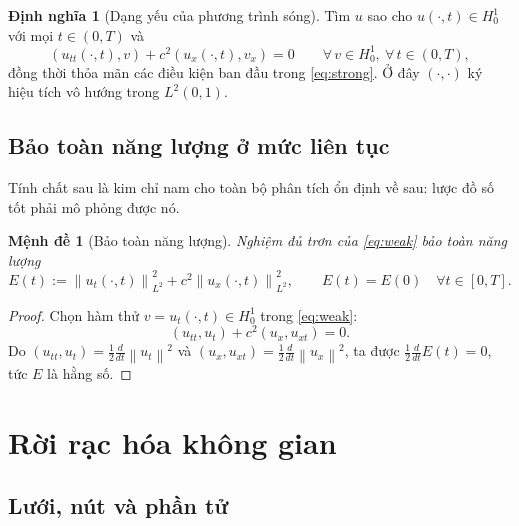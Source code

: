 \documentclass[11pt,a4paper]{article}
\theoremstyle{plain}
\newtheorem{proposition}[theorem]{Mệnh đề}
\theoremstyle{definition}
\newtheorem{definition}[theorem]{Định nghĩa}
\theoremstyle{remark}
\newcommand{\Hzero}{H^{1}_{0}}
\newcommand{\Ltwo}{L^{2}}
\newcommand{\norm}[1]{\left\lVert #1 \right\rVert}
\newcommand{\ip}[2]{\left( #1 , #2 \right)}
\begin{document}
\begin{definition}[Dạng yếu của phương trình sóng]
\label{def:weak}
Tìm $u$ sao cho $u(\cdot,t) \in \Hzero$ với mọi $t \in (0,T)$ và
\begin{equation}
\label{eq:weak}
  \ip{u_{tt}(\cdot,t)}{v} + c^{2}\ip{u_{x}(\cdot,t)}{v_{x}} = 0
  \qquad \forall\, v \in \Hzero,\ \forall\, t \in (0,T),
\end{equation}
đồng thời thỏa mãn các điều kiện ban đầu trong \eqref{eq:strong}. Ở đây
$\ip{\cdot}{\cdot}$ ký hiệu tích vô hướng trong $\Ltwo(0,1)$.
\end{definition}

\subsection{Bảo toàn năng lượng ở mức liên tục}

Tính chất sau là kim chỉ nam cho toàn bộ phân tích ổn định về sau: lược đồ
số tốt phải mô phỏng được nó.

\begin{proposition}[Bảo toàn năng lượng]
\label{prop:energy}
Nghiệm đủ trơn của \eqref{eq:weak} bảo toàn năng lượng
\begin{equation}
\label{eq:cont-energy}
  E(t) := \norm{u_{t}(\cdot,t)}_{\Ltwo}^{2}
        + c^{2}\norm{u_{x}(\cdot,t)}_{\Ltwo}^{2},
  \qquad E(t) = E(0) \quad \forall t \in [0,T].
\end{equation}
\end{proposition}

\begin{proof}
Chọn hàm thử $v = u_{t}(\cdot,t) \in \Hzero$ trong \eqref{eq:weak}:
\[
  \ip{u_{tt}}{u_{t}} + c^{2}\ip{u_{x}}{u_{xt}} = 0 .
\]
Do $\ip{u_{tt}}{u_{t}} = \tfrac{1}{2}\tfrac{d}{dt}\norm{u_{t}}^{2}$ và
$\ip{u_{x}}{u_{xt}} = \tfrac{1}{2}\tfrac{d}{dt}\norm{u_{x}}^{2}$, ta được
$\tfrac{1}{2}\tfrac{d}{dt}E(t) = 0$, tức $E$ là hằng số.
\end{proof}

\section{Rời rạc hóa không gian}
\label{sec:khonggian}

\subsection{Lưới, nút và phần tử}
\end{document}
